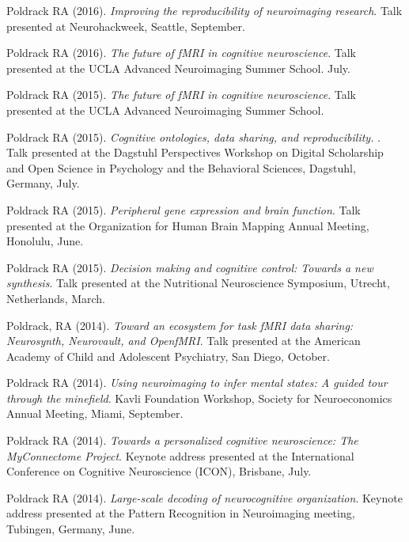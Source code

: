 \documentclass[10pt, letterpaper]{article}
\begin{document}
Poldrack RA (2016). \emph{ Improving the reproducibility of neuroimaging research}. Talk presented at Neurohackweek, Seattle, September. \vspace{2mm}

Poldrack RA (2016). \emph{The future of fMRI in cognitive neuroscience}. Talk presented at the UCLA Advanced Neuroimaging Summer School. July. \vspace{2mm}

Poldrack RA (2015). \emph{The future of fMRI in cognitive neuroscience}. Talk presented at the UCLA Advanced Neuroimaging Summer School. \vspace{2mm}

Poldrack RA (2015). \emph{Cognitive ontologies, data sharing, and reproducibility. }. Talk presented at the Dagstuhl Perspectives Workshop on Digital Scholarship and Open Science in Psychology and the Behavioral Sciences, Dagstuhl, Germany, July. \vspace{2mm}

Poldrack RA (2015). \emph{Peripheral gene expression and brain function}. Talk presented at the Organization for Human Brain Mapping Annual Meeting, Honolulu, June. \vspace{2mm}

Poldrack RA (2015). \emph{Decision making and cognitive control: Towards a new synthesis}. Talk presented at the Nutritional Neuroscience Symposium, Utrecht, Netherlands, March. \vspace{2mm}

Poldrack, RA (2014). \emph{Toward an ecosystem for task fMRI data sharing: Neurosynth, Neurovault, and OpenfMRI}. Talk presented at the American Academy of Child and Adolescent Psychiatry, San Diego, October. \vspace{2mm}

Poldrack RA (2014). \emph{Using neuroimaging to infer mental states: A guided tour through the minefield}. Kavli Foundation Workshop, Society for Neuroeconomics Annual Meeting, Miami, September. \vspace{2mm}

Poldrack RA (2014). \emph{Towards a personalized cognitive neuroscience: The MyConnectome Project}. Keynote address presented at the International Conference on Cognitive Neuroscience (ICON), Brisbane, July. \vspace{2mm}

Poldrack RA (2014). \emph{Large-scale decoding of neurocognitive organization}. Keynote address presented at the Pattern Recognition in Neuroimaging meeting, Tubingen, Germany, June. \vspace{2mm}
\end{document}
